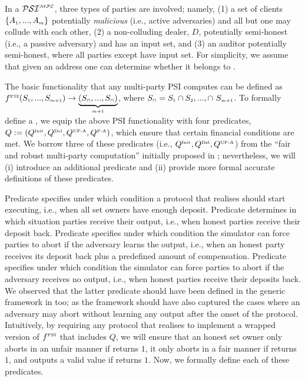   
In a  $\mathcal{PSI}^{\scriptscriptstyle \mathcal{MFC}}$, three types of parties are involved; namely, (1) a set of clients $\{A_{\scriptscriptstyle 1},...,A_{\scriptscriptstyle m}\}$ potentially \emph{malicious} (i.e., active adversaries) and all but one may collude with each other, (2) a non-colluding dealer, $D$, potentially semi-honest (i.e., a passive adversary) and has an input set, and (3) an auditor \aud potentially semi-honest, where all parties except \aud have input set. For simplicity, we assume that given an address one can determine whether it belongs to \aud. 


The basic functionality that any multi-party PSI computes can be defined as $f^{\scriptscriptstyle\text{PSI}} (S_{\scriptscriptstyle 1},..., S_{\scriptscriptstyle m+1})\rightarrow\underbrace{(S_{\scriptscriptstyle\cap},..., S_{\scriptscriptstyle\cap})}_{\scriptscriptstyle m+1}$, where $S_{\scriptscriptstyle\cap}= S_{\scriptscriptstyle 1} \cap S_{\scriptscriptstyle 2}, ...,\cap\  S_{\scriptscriptstyle m+1}$.  To formally define a \p, we equip the above PSI functionality with four predicates,  $Q:=(Q^{\scriptscriptstyle \text{Init}}, Q^{\scriptscriptstyle \text{Del}}, Q^{\scriptscriptstyle \text{UF-A}}, Q^{\scriptscriptstyle \text{F-A}})$, which ensure that certain financial conditions are met. 
   We borrow three of these predicates (i.e., $Q^{\scriptscriptstyle \text{Init}}, Q^{\scriptscriptstyle \text{Del}}, Q^{\scriptscriptstyle \text{UF-A}}$) from the ``fair and robust multi-party computation'' initially proposed in \cite{KiayiasZZ16}; nevertheless, we will (i) introduce an additional predicate  \qFAbt and (ii) provide more formal accurate definitions of these predicates. 
   
Predicate \qinit specifies under which condition a protocol that realises \p should start executing, i.e., when all set owners have enough deposit. Predicate \qdel determines in which situation parties receive their output, i.e., when honest parties receive their deposit back. Predicate \qUnFAbt specifies under which condition the simulator can force parties to abort if the adversary learns the output,  i.e., when an honest party receives its deposit back plus a predefined amount of compensation. Predicate \qFAbt specifies under which condition the simulator can force parties to abort if the adversary receives no output, i.e., when honest parties receive their deposits back. We observed that the latter predicate should have been defined in the generic framework in \cite{KiayiasZZ16} too; as the framework should have also captured the cases where an adversary may abort without learning any output after the onset of the protocol.  Intuitively, by requiring any protocol that realises \p to implement a wrapped version of $f^{\scriptscriptstyle\text{PSI}}$ that includes $Q$, we will ensure that an honest set owner only aborts in an unfair manner if \qUnFAbt returns  $1$, it only aborts in a fair manner if \qFAbt returns  $1$, and outputs a valid value if \qdel returns $1$. Now, we formally define each of these predicates.  
 

